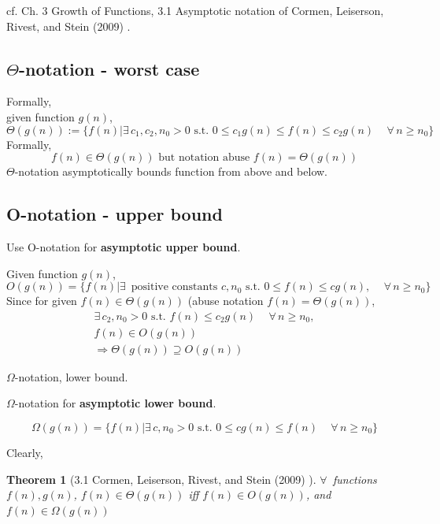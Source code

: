 \documentclass[10pt]{amsart}
\newtheorem{theorem}{Theorem}
\begin{document}
cf. Ch. 3 Growth of Functions, 3.1 Asymptotic notation of Cormen, Leiserson, Rivest, and Stein (2009) \cite{CLRS2009}.

\subsection{$\Theta$-notation - worst case}


Formally, \\
given function $g(n)$, 
\begin{equation}
\Theta(g(n)) := \lbrace f(n) | \exists \, c_1, c_2, n_0 > 0 \text{ s.t. } 0 \leq c_1 g(n) \leq f(n) \leq c_2 g(n) \quad \, \forall \, n \geq n_0 \rbrace 
\end{equation}
Formally, \\
\[
f(n) \in \Theta (g(n)) \text{ but notation abuse } f(n) = \Theta(g(n))
\]
$\Theta$-notation asymptotically bounds function from above and below.

\subsection{O-notation - upper bound}

Use O-notation for \textbf{asymptotic upper bound}.

Given function $g(n)$, 
\begin{equation}
O(g(n)) = \lbrace f(n) | \exists \, \text{ positive constants } c, n_0 \text{ s.t. } 0 \leq f(n) \leq c g(n), \quad \, \forall \, n \geq n_0 \rbrace 
\end{equation}
Since for given $f(n) \in \Theta(g(n))$ (abuse notation $f(n) = \Theta(g(n))$, 
\[
\begin{gathered} 
\exists \, c_2, n_0 > 0 \text{ s.t. } f(n) \leq c_2 g(n) \quad \, \forall \, n \geq n_0, \\
f(n) \in O(g(n)) \\
\Longrightarrow \Theta(g(n)) \supseteq O(g(n))
\end{gathered}
\]

$\Omega$-notation, lower bound.

$\Omega$-notation for \textbf{asymptotic lower bound}.

\begin{equation}
\Omega(g(n)) = \lbrace f(n) | \exists \, c, n_0 >0 \text{ s.t. } 0 \leq cg(n) \leq f(n) \quad \, \forall \, n \geq n_0 \rbrace 
\end{equation}

Clearly,
\begin{theorem}[3.1 Cormen, Leiserson, Rivest, and Stein (2009) \cite{CLRS2009}]
	$\forall \, $ functions $f(n), g(n)$, $f(n) \in \Theta(g(n))$ iff $f(n) \in O(g(n))$, and $f(n) \in \Omega(g(n))$
\end{theorem}
\end{document}
